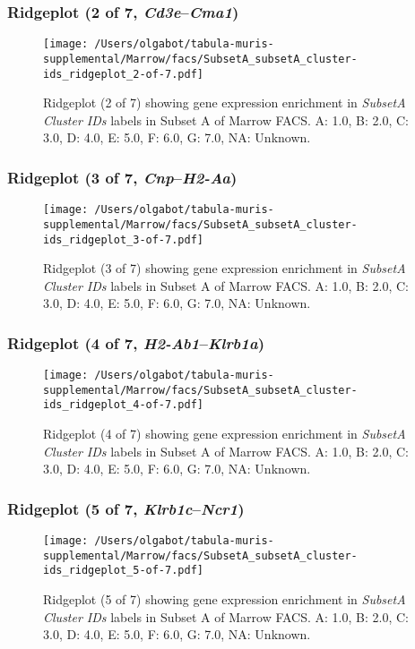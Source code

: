 \clearpage

\subsubsection{Ridgeplot (2 of 7, \emph{Cd3e}--\emph{Cma1})}
\begin{figure}[h]
\centering
\texttt{[image: /Users/olgabot/tabula-muris-supplemental/Marrow/facs/SubsetA\_subsetA\_cluster-ids\_ridgeplot\_2-of-7.pdf]}

\caption{ Ridgeplot (2 of 7)  showing gene expression enrichment in \emph{SubsetA Cluster IDs} labels in Subset A of Marrow FACS. A: 1.0, B: 2.0, C: 3.0, D: 4.0, E: 5.0, F: 6.0, G: 7.0, NA: Unknown.}
\end{figure}


\clearpage

\subsubsection{Ridgeplot (3 of 7, \emph{Cnp}--\emph{H2-Aa})}
\begin{figure}[h]
\centering
\texttt{[image: /Users/olgabot/tabula-muris-supplemental/Marrow/facs/SubsetA\_subsetA\_cluster-ids\_ridgeplot\_3-of-7.pdf]}

\caption{ Ridgeplot (3 of 7)  showing gene expression enrichment in \emph{SubsetA Cluster IDs} labels in Subset A of Marrow FACS. A: 1.0, B: 2.0, C: 3.0, D: 4.0, E: 5.0, F: 6.0, G: 7.0, NA: Unknown.}
\end{figure}


\clearpage

\subsubsection{Ridgeplot (4 of 7, \emph{H2-Ab1}--\emph{Klrb1a})}
\begin{figure}[h]
\centering
\texttt{[image: /Users/olgabot/tabula-muris-supplemental/Marrow/facs/SubsetA\_subsetA\_cluster-ids\_ridgeplot\_4-of-7.pdf]}

\caption{ Ridgeplot (4 of 7)  showing gene expression enrichment in \emph{SubsetA Cluster IDs} labels in Subset A of Marrow FACS. A: 1.0, B: 2.0, C: 3.0, D: 4.0, E: 5.0, F: 6.0, G: 7.0, NA: Unknown.}
\end{figure}


\clearpage

\subsubsection{Ridgeplot (5 of 7, \emph{Klrb1c}--\emph{Ncr1})}
\begin{figure}[h]
\centering
\texttt{[image: /Users/olgabot/tabula-muris-supplemental/Marrow/facs/SubsetA\_subsetA\_cluster-ids\_ridgeplot\_5-of-7.pdf]}

\caption{ Ridgeplot (5 of 7)  showing gene expression enrichment in \emph{SubsetA Cluster IDs} labels in Subset A of Marrow FACS. A: 1.0, B: 2.0, C: 3.0, D: 4.0, E: 5.0, F: 6.0, G: 7.0, NA: Unknown.}
\end{figure}


